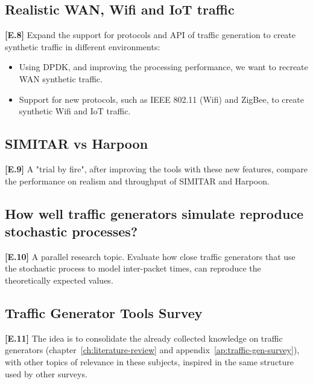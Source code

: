 \subsection{Realistic WAN, Wifi and IoT traffic}

\textbf{[E.8]} Expand the support for protocols and API of traffic generation to create synthetic traffic in different environments:
\begin{itemize}
\item Using DPDK, and improving the processing performance, we want to recreate WAN synthetic traffic. 
\item Support for new protocols, such as IEEE 802.11 (Wifi) and ZigBee, to create synthetic Wifi and IoT traffic.
\end{itemize}

\subsection{SIMITAR vs Harpoon}

\textbf{[E.9]} A "trial by fire", after improving the tools with these new features, compare the performance on realism and throughput of SIMITAR and Harpoon.

\subsection{How well traffic generators simulate reproduce stochastic processes?}

\textbf{[E.10]} A parallel research topic. Evaluate how close traffic generators that use the stochastic process to model inter-packet times, can reproduce the theoretically expected values. 

\subsection{Traffic Generator Tools Survey}

\textbf{[E.11]} The idea is to consolidate the already collected knowledge on traffic generators (chapter~\ref{ch:literature-review} and appendix~\ref{ap:traffic-gen-survey}), with other topics of relevance in these subjects, inspired in the same structure used by other surveys.